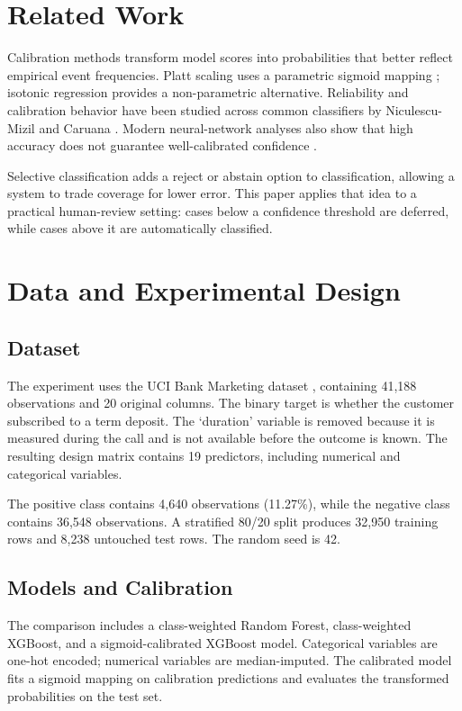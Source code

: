 \documentclass[conference]{IEEEtran}
\begin{document}
\section{Related Work}
Calibration methods transform model scores into probabilities that better reflect empirical event frequencies. Platt scaling uses a parametric sigmoid mapping \cite{platt1999}; isotonic regression provides a non-parametric alternative. Reliability and calibration behavior have been studied across common classifiers by Niculescu-Mizil and Caruana \cite{niculescu2005}. Modern neural-network analyses also show that high accuracy does not guarantee well-calibrated confidence \cite{guo2017}.

Selective classification adds a reject or abstain option to classification, allowing a system to trade coverage for lower error. This paper applies that idea to a practical human-review setting: cases below a confidence threshold are deferred, while cases above it are automatically classified.

\section{Data and Experimental Design}
\subsection{Dataset}
The experiment uses the UCI Bank Marketing dataset \cite{moro2014}, containing 41,188 observations and 20 original columns. The binary target is whether the customer subscribed to a term deposit. The `duration' variable is removed because it is measured during the call and is not available before the outcome is known. The resulting design matrix contains 19 predictors, including numerical and categorical variables.

The positive class contains 4,640 observations (11.27\%), while the negative class contains 36,548 observations. A stratified 80/20 split produces 32,950 training rows and 8,238 untouched test rows. The random seed is 42.

\subsection{Models and Calibration}
The comparison includes a class-weighted Random Forest, class-weighted XGBoost, and a sigmoid-calibrated XGBoost model. Categorical variables are one-hot encoded; numerical variables are median-imputed. The calibrated model fits a sigmoid mapping on calibration predictions and evaluates the transformed probabilities on the test set.
\end{document}
